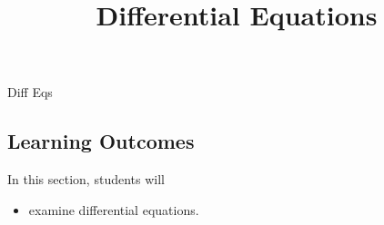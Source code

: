 \documentclass{ximera}
\title{Differential Equations}
\begin{document}
\begin{abstract}
\end{abstract}
\maketitle


Diff Eqs







\subsection{Learning Outcomes}


\begin{sectionOutcomes}
In this section, students will 

\begin{itemize}
\item examine differential equations.
\end{itemize}
\end{sectionOutcomes}
\end{document}
